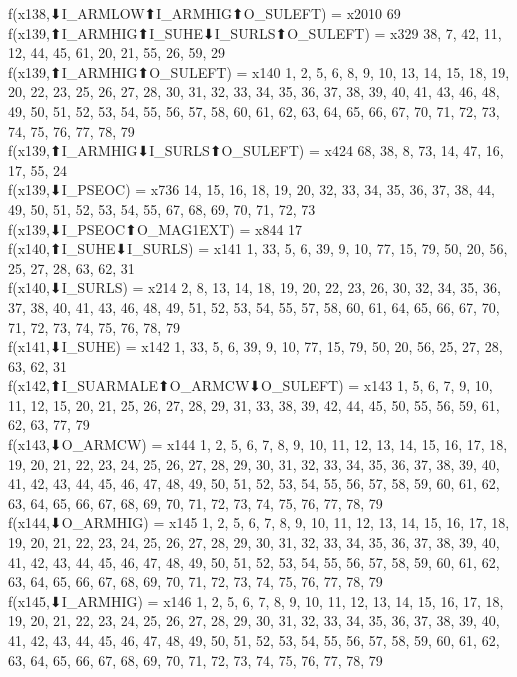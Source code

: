 f(x138,⬇I_ARMLOW⬆I_ARMHIG⬆O_SULEFT) = x2010 {69} \\
f(x139,⬆I_ARMHIG⬆I_SUHE⬇I_SURLS⬆O_SULEFT) = x329 {38, 7, 42, 11, 12, 44, 45, 61, 20, 21, 55, 26, 59, 29} \\
f(x139,⬆I_ARMHIG⬆O_SULEFT) = x140 {1, 2, 5, 6, 8, 9, 10, 13, 14, 15, 18, 19, 20, 22, 23, 25, 26, 27, 28, 30, 31, 32, 33, 34, 35, 36, 37, 38, 39, 40, 41, 43, 46, 48, 49, 50, 51, 52, 53, 54, 55, 56, 57, 58, 60, 61, 62, 63, 64, 65, 66, 67, 70, 71, 72, 73, 74, 75, 76, 77, 78, 79} \\
f(x139,⬆I_ARMHIG⬇I_SURLS⬆O_SULEFT) = x424 {68, 38, 8, 73, 14, 47, 16, 17, 55, 24} \\
f(x139,⬇I_PSEOC) = x736 {14, 15, 16, 18, 19, 20, 32, 33, 34, 35, 36, 37, 38, 44, 49, 50, 51, 52, 53, 54, 55, 67, 68, 69, 70, 71, 72, 73} \\
f(x139,⬇I_PSEOC⬆O_MAG1EXT) = x844 {17} \\
f(x140,⬆I_SUHE⬇I_SURLS) = x141 {1, 33, 5, 6, 39, 9, 10, 77, 15, 79, 50, 20, 56, 25, 27, 28, 63, 62, 31} \\
f(x140,⬇I_SURLS) = x214 {2, 8, 13, 14, 18, 19, 20, 22, 23, 26, 30, 32, 34, 35, 36, 37, 38, 40, 41, 43, 46, 48, 49, 51, 52, 53, 54, 55, 57, 58, 60, 61, 64, 65, 66, 67, 70, 71, 72, 73, 74, 75, 76, 78, 79} \\
f(x141,⬇I_SUHE) = x142 {1, 33, 5, 6, 39, 9, 10, 77, 15, 79, 50, 20, 56, 25, 27, 28, 63, 62, 31} \\
f(x142,⬆I_SUARMALE⬆O_ARMCW⬇O_SULEFT) = x143 {1, 5, 6, 7, 9, 10, 11, 12, 15, 20, 21, 25, 26, 27, 28, 29, 31, 33, 38, 39, 42, 44, 45, 50, 55, 56, 59, 61, 62, 63, 77, 79} \\
f(x143,⬇O_ARMCW) = x144 {1, 2, 5, 6, 7, 8, 9, 10, 11, 12, 13, 14, 15, 16, 17, 18, 19, 20, 21, 22, 23, 24, 25, 26, 27, 28, 29, 30, 31, 32, 33, 34, 35, 36, 37, 38, 39, 40, 41, 42, 43, 44, 45, 46, 47, 48, 49, 50, 51, 52, 53, 54, 55, 56, 57, 58, 59, 60, 61, 62, 63, 64, 65, 66, 67, 68, 69, 70, 71, 72, 73, 74, 75, 76, 77, 78, 79} \\
f(x144,⬇O_ARMHIG) = x145 {1, 2, 5, 6, 7, 8, 9, 10, 11, 12, 13, 14, 15, 16, 17, 18, 19, 20, 21, 22, 23, 24, 25, 26, 27, 28, 29, 30, 31, 32, 33, 34, 35, 36, 37, 38, 39, 40, 41, 42, 43, 44, 45, 46, 47, 48, 49, 50, 51, 52, 53, 54, 55, 56, 57, 58, 59, 60, 61, 62, 63, 64, 65, 66, 67, 68, 69, 70, 71, 72, 73, 74, 75, 76, 77, 78, 79} \\
f(x145,⬇I_ARMHIG) = x146 {1, 2, 5, 6, 7, 8, 9, 10, 11, 12, 13, 14, 15, 16, 17, 18, 19, 20, 21, 22, 23, 24, 25, 26, 27, 28, 29, 30, 31, 32, 33, 34, 35, 36, 37, 38, 39, 40, 41, 42, 43, 44, 45, 46, 47, 48, 49, 50, 51, 52, 53, 54, 55, 56, 57, 58, 59, 60, 61, 62, 63, 64, 65, 66, 67, 68, 69, 70, 71, 72, 73, 74, 75, 76, 77, 78, 79} \\
